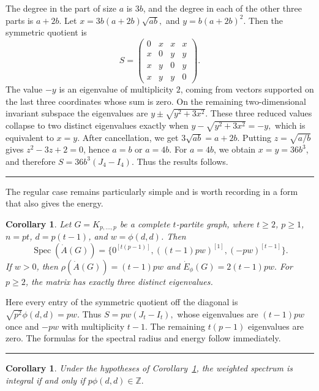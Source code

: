 \documentclass[12pt,twoside]{article}
\renewenvironment{proof}{{\noindent\bfseries Proof.}}{\qed}
\newcommand{\spec}{\operatorname{Spec}}
\newtheorem{corollary}[theorem]{Corollary}
\def\qed{\nolinebreak\hfill\rule{.2cm}{.2cm}\par\addvspace{.5cm}}
\begin{document}
\begin{proof}
	The degree in the part of size $a$ is $3b$, and the degree in each of the other three parts is $a+2b$. Let
	$
	x=3b(a+2b)\sqrt{ab},$ and $y=b(a+2b)^2.
	$
	Then the symmetric quotient is
	$$
	S=\begin{pmatrix}
		0&x&x&x\\
		x&0&y&y\\
		x&y&0&y\\
		x&y&y&0
	\end{pmatrix}.
	$$
	The value $-y$ is an eigenvalue of multiplicity $2$, coming from vectors supported on the last three coordinates whose sum is zero. On the remaining two-dimensional invariant subspace the eigenvalues are
	$
	y\pm\sqrt{y^2+3x^2}.
	$
	These three reduced values collapse to two distinct eigenvalues exactly when
	$
	y-\sqrt{y^2+3x^2}=-y,
	$
	which is equivalent to $x=y$. After cancellation, we get
	$
	3\sqrt{ab}=a+2b.
	$
	Putting $z=\sqrt{a/b}$ gives $z^2-3z+2=0$, hence $a=b$ or $a=4b$. For $a=4b$, we obtain $x=y=36b^3$, and therefore $S=36b^3(J_4-I_4)$. Thus the results follows.
\end{proof}


The regular case remains particularly simple and is worth recording in a form that also gives the energy.

\begin{corollary}\label{cor:regular_multipartite_spectrum_updated}
	Let $G=K_{p,\ldots,p}$ be a complete $t$-partite graph, where $t\ge 2$, $p\ge 1$, $n=pt$, $d=p(t-1)$, and $w=\phi(d,d)$. Then
	$$
	\spec(\dot A(G))
	=\{0^{[t(p-1)]},((t-1)pw)^{[1]},(-pw)^{[t-1]}\}.
	$$
	If $w>0$, then
	$
	\rho(\dot A(G))=(t-1)pw
	$
	and
	$
	\dot E_\phi(G)=2(t-1)pw.
	$
	For $p\ge 2$, the matrix has exactly three distinct eigenvalues.
\end{corollary}

\begin{proof}
	Here every entry of the symmetric quotient off the diagonal is
	$
	\sqrt{p^2}\phi(d,d)=pw.
	$
	Thus
	$
	S=pw(J_t-I_t),
	$
	whose eigenvalues are $(t-1)pw$ once and $-pw$ with multiplicity $t-1$. The remaining $t(p-1)$ eigenvalues are zero. The formulas for the spectral radius and energy follow immediately.
\end{proof}

\begin{corollary}\label{cor:integrality_regular_multipartite_updated}
	Under the hypotheses of Corollary~\ref{cor:regular_multipartite_spectrum_updated}, the weighted spectrum is integral if and only if
	$
	p\phi(d,d)\in\mathbb Z.
	$
\end{corollary}
\end{document}
